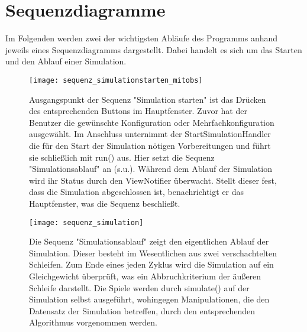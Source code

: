 \section{Sequenzdiagramme}

Im Folgenden werden zwei der wichtigsten Abläufe des Programms anhand jeweils eines Sequenzdiagramms dargestellt.
Dabei handelt es sich um das Starten und den Ablauf einer Simulation.

\begin{figure}[htbp]
{\centering 
\texttt{[image: sequenz\_simulationstarten\_mitobs]}}
\bigskip


Ausgangspunkt der Sequenz "Simulation starten" ist das Drücken des entsprechenden Buttons im Hauptfenster. Zuvor hat der Benutzer die gewünschte Konfiguration oder Mehrfachkonfiguration ausgewählt.
Im Anschluss unternimmt der StartSimulationHandler die für den Start der Simulation nötigen Vorbereitungen und führt sie schließlich mit run() aus.
Hier setzt die Sequenz "Simulationsablauf" an (s.u.).
Während dem Ablauf der Simulation wird ihr Status durch den ViewNotifier überwacht. Stellt dieser fest, dass die Simulation abgeschlossen ist, benachrichtigt er das Hauptfenster, was die Sequenz beschließt.
\end{figure}

\begin{figure}[htbp]
{\centering 
\texttt{[image: sequenz\_simulation]}}
\bigskip


Die Sequenz "Simulationsablauf" zeigt den eigentlichen Ablauf der Simulation. Dieser besteht im Wesentlichen aus zwei verschachtelten Schleifen. Zum Ende eines jeden Zyklus wird die Simulation auf ein Gleichgewicht überprüft, was ein Abbruchkriterium der äußeren Schleife darstellt.
Die Spiele werden durch simulate() auf der Simulation selbst ausgeführt, wohingegen Manipulationen, die den Datensatz der Simulation betreffen, durch den entsprechenden Algorithmus vorgenommen werden.

\end{figure}




